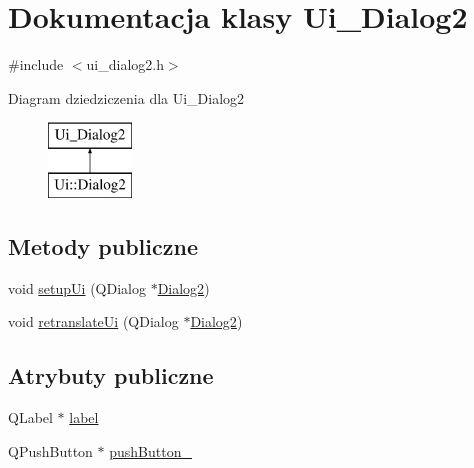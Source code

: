 \hypertarget{classUi__Dialog2}{\section{Dokumentacja klasy Ui\-\_\-\-Dialog2}
\label{classUi__Dialog2}
}


{\ttfamily \#include $<$ui\-\_\-dialog2.\-h$>$}

Diagram dziedziczenia dla Ui\-\_\-\-Dialog2\begin{figure}[H]
\begin{center}
\leavevmode
\includegraphics[height=2.000000cm]{classUi__Dialog2}
\end{center}
\end{figure}
\subsection*{Metody publiczne}
\begin{DoxyCompactItemize}
\item 
void \hyperlink{classUi__Dialog2_a6844bf81dbbb01d6eb47136862dccaa8}{setup\-Ui} (Q\-Dialog $\ast$\hyperlink{classDialog2}{Dialog2})
\item 
void \hyperlink{classUi__Dialog2_a26d6371581ce3b88c8814129a6bdc607}{retranslate\-Ui} (Q\-Dialog $\ast$\hyperlink{classDialog2}{Dialog2})
\end{DoxyCompactItemize}
\subsection*{Atrybuty publiczne}
\begin{DoxyCompactItemize}
\item 
Q\-Label $\ast$ \hyperlink{classUi__Dialog2_a8dbc9bc2d13fc587b1013a6fea211419}{label}
\item 
Q\-Push\-Button $\ast$ \hyperlink{classUi__Dialog2_a02fa58cd4b3b9c0e32a192c4178899e1}{push\-Button\-\_}
\end{DoxyCompactItemize}


